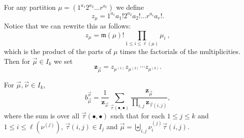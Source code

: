 For any partition $\mu = (1^{a_1} 2^{a_2} \ldots r^{a_r})$ we define
\[
    z_\mu = 1^{a_1} a_1! 2^{a_2} a_2! \ldots r^{a_r}a_r!.
\]
Notice that we can rewrite this as follows:
\[
    z_\mu = \mathfrak{m}(\mu)!\prod_{1\leqslant i\leqslant \ell(\mu)}\mu_i ~,
\]
which is the product of the parts of $\mu$ times the factorials of the multiplicities.
Then for $\vec{\mu} \in I_k$ we set
\[
    \mathbf{z}_{\vec{\mu}} = z_{\mu^{(1)}}z_{\mu^{(2)}}\cdots z_{\mu^{(k)}}.
\]

\begin{cor}
For $\vec{\mu}, \vec{\nu} \in I_k$,
\begin{equation}\label{eq:BinZ}
    b_{\vec{\mu}}^{\vec{\nu}} = \frac{1}{\mathbf{z}_{\vec{\nu}}} \sum_{\vec{\tau}(\bullet, \bullet)}\frac{\mathbf{z}_{\vec{\mu}}}{\prod_{i,j}\mathbf{z}_{\vec{\tau}(i,j)}},
\end{equation}
where the sum is over all $\vec{\tau}(\bullet, \bullet)$
such that for each $1\leqslant j\leqslant k$ and $1 \leqslant i \leqslant \ell(\nu^{(j)})$,
$\vec{\tau}(i,j) \in I_j$
and $\vec{\mu} = \biguplus_{i,j} \nu_i^{(j)} \vec{\tau}(i,j)$.
\end{cor}

